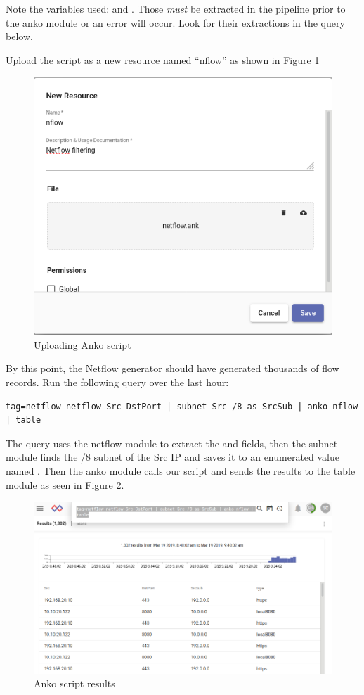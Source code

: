 Note the variables used:  and . Those \emph{must} be
extracted in the pipeline prior to the anko module or an error will
occur. Look for their extractions in the query below.

Upload the script as a new resource named ``nflow'' as shown in Figure \ref{fig:script-upload}

\begin{figure}
	\includegraphics[width=0.5\linewidth]{images/script-upload.png}
	\caption{Uploading Anko script}
	\label{fig:script-upload}
\end{figure}

By this point, the Netflow generator should have generated thousands of
flow records. Run the following query over the last hour:

\begin{Verbatim}[breaklines=true]
tag=netflow netflow Src DstPort | subnet Src /8 as SrcSub | anko nflow | table
\end{Verbatim}

The query uses the netflow module to extract the  and
 fields, then the subnet module finds the /8 subnet of the
Src IP and saves it to an enumerated value named . Then
the anko module calls our script and sends the results to the table
module as seen in Figure \ref{fig:script-results}.

\begin{figure}
	\includegraphics{images/script-results.png}
	\caption{Anko script results}
	\label{fig:script-results}
\end{figure}

